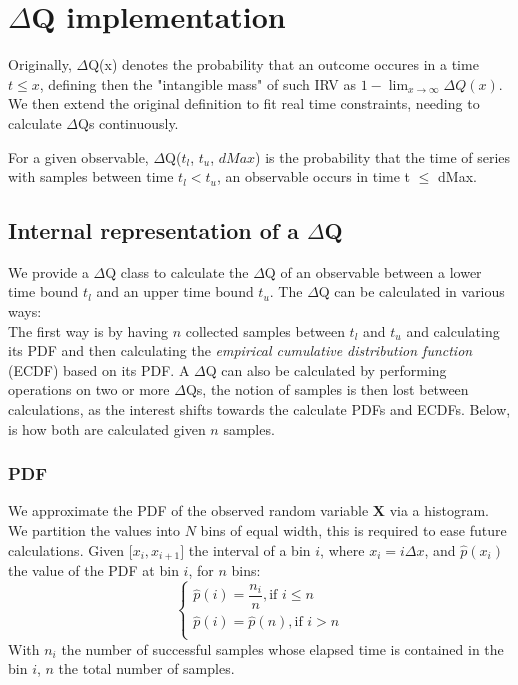 \section{$\Delta$Q implementation}

Originally, $\Delta$Q(x) denotes the probability that an outcome occures in a time $t \le x$, defining then the "intangible mass" of such IRV as $1 - \lim_{x\to\infty} \Delta Q (x)$.
We then extend the original definition to fit real time constraints, needing to calculate $\Delta$Qs continuously.

For a given observable, $\Delta$Q($t_l$, $t_u$, $dMax$) is the probability that the time of series with samples between time $t_l < t_u$, an observable occurs in time t $\le$ dMax.


\subsection{Internal representation of a $\Delta$Q}
    We provide a $\Delta$Q class to calculate the $\Delta$Q of an observable between a lower time bound $t_l$ and an upper time bound $t_u$.
    The $\Delta$Q can be calculated in various ways: \\
    The first way is by having $n$ collected samples between $t_l$ and $t_u$ and calculating its PDF and then calculating the \textit{empirical cumulative distribution function} (ECDF) based on its PDF.
    A $\Delta$Q can also be calculated by performing operations on two or more $\Delta$Qs, the notion of samples is then lost between calculations, as the interest shifts towards the calculate PDFs and ECDFs.
    Below, is how both are calculated given $n$ samples.
    \subsubsection{PDF}
  We approximate the PDF of the observed random variable $\textbf{X}$ via a histogram. We partition the values into $N$ bins of equal width, this is required to ease future calculations.
        Given $\lbrack x_i, x_{i+1} \rbrack$ the interval of a bin $i$, where $x_i = i\Delta x$, and $\hat{p}(x_i)$ the value of the PDF at bin $i$, for $n$ bins:
        \begin{equation}
            \begin{cases}
                \hat{p}(i) = \dfrac{n_i}{n}, \text{if } i \le n \\
                \hat{p}(i) = \hat{p}(n), \text{if } i > n \\
            \end{cases}
            \label{eq:pdf}
        \end{equation}
   With $n_i$ the number of successful samples whose elapsed time is contained in the bin $i$, $n$ the total number of samples.
